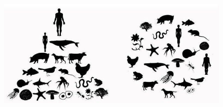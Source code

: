 \begin{figure}[ht]
\begin{center}
\includegraphics[scale=0.5]{SDviews}
\end{center}
\end{figure}

\clearpage

